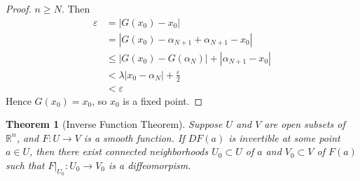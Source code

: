 \documentclass[reqno]{amsart}
\theoremstyle{plain}%
\newtheorem{theorem}{Theorem}[section]
\theoremstyle{definition}
\theoremstyle{remark}
\begin{document}
\begin{proof}
        $n \ge N$. Then
        \begin{align*}
            \varepsilon 
            &= \left| G(x_0) - x_0 \right| \\
            &= \left| G(x_0) - \alpha_{N+1} + \alpha_{N+1} -x_0 \right| \\
            &\le \left| G(x_0) - G\left( \alpha_N \right)  \right| 
            + \left| \alpha_{N+1}-x_0 \right| \\
            &< \lambda \left| x_0 - \alpha_N \right| + \frac{\varepsilon}{2}\\
            &< \varepsilon
        \end{align*}
        Hence $G(x_0) = x_0$, so $x_0$ is a fixed point.
        \end{proof}




        \begin{theorem}[Inverse Function Theorem]\label{inverse-function-thm}
        Suppose $U$ and $V$ are open subsets of $\mathbb{R}^{n}$, and
        $F  \colon U \to V$ is a smooth function. If $DF(a)$ is invertible at some
        point $a \in U$, then there exist connected neighborhoods
        $U_0 \subset U$ of $a$ and $V_0 \subset V$ of $F(a)$ such that
        $F|_{U_0}  \colon U_0 \to V_0$ is a diffeomorpism.
        \end{theorem}
\end{document}

